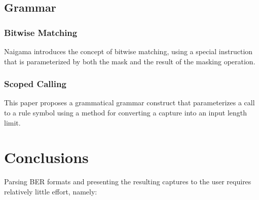 \subsection{Grammar}

\subsubsection{Bitwise Matching}

Naigama introduces the concept of bitwise matching, using a special 
instruction that is parameterized by both the mask and the result of the 
masking operation.

\subsubsection{Scoped Calling}

This paper proposes a grammatical grammar construct that parameterizes a 
call to a rule symbol using a method for converting a capture into an 
input length limit.

\newpage
\section{Conclusions}

Parsing BER formats and presenting the resulting captures to the user 
requires relatively little effort, namely:

